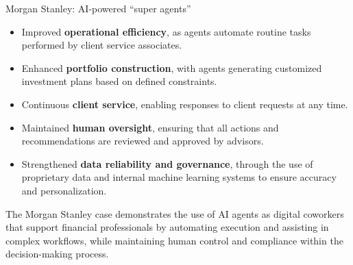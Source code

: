 \documentclass{article}
\begin{document}
\begin{usecasebox}{Morgan Stanley: AI-powered “super agents”}
\begin{itemize}
  \item Improved \textbf{operational efficiency}, as agents automate routine tasks performed by client service associates.
  \item Enhanced \textbf{portfolio construction}, with agents generating customized investment plans based on defined constraints.
  \item Continuous \textbf{client service}, enabling responses to client requests at any time.
  \item Maintained \textbf{human oversight}, ensuring that all actions and recommendations are reviewed and approved by advisors.
  \item Strengthened \textbf{data reliability and governance}, through the use of proprietary data and internal machine learning systems to ensure accuracy and personalization.
\end{itemize}

The Morgan Stanley case demonstrates the use of AI agents as digital coworkers that support financial professionals by automating execution and assisting in complex workflows, while maintaining human control and compliance within the decision-making process.






\end{usecasebox}
\end{document}
